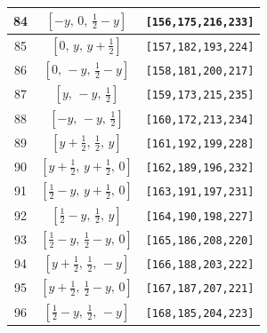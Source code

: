 \documentclass[fleqn,8pt]{jsarticle}
\begin{document}
\begin{longtable}{ccc}
84 & $\left[ - y,\, 0,\, \frac{1}{2} - y \right]$ & {\tt [156,175,216,233]} \\ \hline
85 & $\left[ 0,\, y,\, y + \frac{1}{2} \right]$ & {\tt [157,182,193,224]} \\ \hline
86 & $\left[ 0,\, - y,\, \frac{1}{2} - y \right]$ & {\tt [158,181,200,217]} \\ \hline
87 & $\left[ y,\, - y,\, \frac{1}{2} \right]$ & {\tt [159,173,215,235]} \\ \hline
88 & $\left[ - y,\, - y,\, \frac{1}{2} \right]$ & {\tt [160,172,213,234]} \\ \hline
89 & $\left[ y + \frac{1}{2},\, \frac{1}{2},\, y \right]$ & {\tt [161,192,199,228]} \\ \hline
90 & $\left[ y + \frac{1}{2},\, y + \frac{1}{2},\, 0 \right]$ & {\tt [162,189,196,232]} \\ \hline
91 & $\left[ \frac{1}{2} - y,\, y + \frac{1}{2},\, 0 \right]$ & {\tt [163,191,197,231]} \\ \hline
92 & $\left[ \frac{1}{2} - y,\, \frac{1}{2},\, y \right]$ & {\tt [164,190,198,227]} \\ \hline
93 & $\left[ \frac{1}{2} - y,\, \frac{1}{2} - y,\, 0 \right]$ & {\tt [165,186,208,220]} \\ \hline
94 & $\left[ y + \frac{1}{2},\, \frac{1}{2},\, - y \right]$ & {\tt [166,188,203,222]} \\ \hline
95 & $\left[ y + \frac{1}{2},\, \frac{1}{2} - y,\, 0 \right]$ & {\tt [167,187,207,221]} \\ \hline
96 & $\left[ \frac{1}{2} - y,\, \frac{1}{2},\, - y \right]$ & {\tt [168,185,204,223]} \\
\end{longtable}
\renewcommand{\arraystretch}{1.2}
\end{document}
